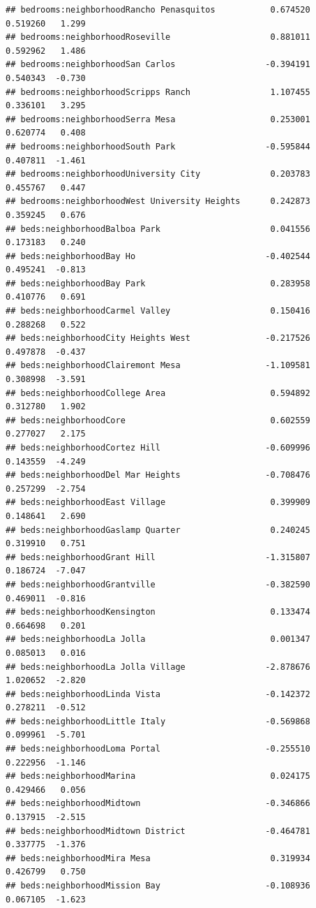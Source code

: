 \documentclass[
]{book}
\begin{document}
\begin{verbatim}
## bedrooms:neighborhoodRancho Penasquitos           0.674520   0.519260   1.299
## bedrooms:neighborhoodRoseville                    0.881011   0.592962   1.486
## bedrooms:neighborhoodSan Carlos                  -0.394191   0.540343  -0.730
## bedrooms:neighborhoodScripps Ranch                1.107455   0.336101   3.295
## bedrooms:neighborhoodSerra Mesa                   0.253001   0.620774   0.408
## bedrooms:neighborhoodSouth Park                  -0.595844   0.407811  -1.461
## bedrooms:neighborhoodUniversity City              0.203783   0.455767   0.447
## bedrooms:neighborhoodWest University Heights      0.242873   0.359245   0.676
## beds:neighborhoodBalboa Park                      0.041556   0.173183   0.240
## beds:neighborhoodBay Ho                          -0.402544   0.495241  -0.813
## beds:neighborhoodBay Park                         0.283958   0.410776   0.691
## beds:neighborhoodCarmel Valley                    0.150416   0.288268   0.522
## beds:neighborhoodCity Heights West               -0.217526   0.497878  -0.437
## beds:neighborhoodClairemont Mesa                 -1.109581   0.308998  -3.591
## beds:neighborhoodCollege Area                     0.594892   0.312780   1.902
## beds:neighborhoodCore                             0.602559   0.277027   2.175
## beds:neighborhoodCortez Hill                     -0.609996   0.143559  -4.249
## beds:neighborhoodDel Mar Heights                 -0.708476   0.257299  -2.754
## beds:neighborhoodEast Village                     0.399909   0.148641   2.690
## beds:neighborhoodGaslamp Quarter                  0.240245   0.319910   0.751
## beds:neighborhoodGrant Hill                      -1.315807   0.186724  -7.047
## beds:neighborhoodGrantville                      -0.382590   0.469011  -0.816
## beds:neighborhoodKensington                       0.133474   0.664698   0.201
## beds:neighborhoodLa Jolla                         0.001347   0.085013   0.016
## beds:neighborhoodLa Jolla Village                -2.878676   1.020652  -2.820
## beds:neighborhoodLinda Vista                     -0.142372   0.278211  -0.512
## beds:neighborhoodLittle Italy                    -0.569868   0.099961  -5.701
## beds:neighborhoodLoma Portal                     -0.255510   0.222956  -1.146
## beds:neighborhoodMarina                           0.024175   0.429466   0.056
## beds:neighborhoodMidtown                         -0.346866   0.137915  -2.515
## beds:neighborhoodMidtown District                -0.464781   0.337775  -1.376
## beds:neighborhoodMira Mesa                        0.319934   0.426799   0.750
## beds:neighborhoodMission Bay                     -0.108936   0.067105  -1.623

\end{verbatim}
\end{document}
